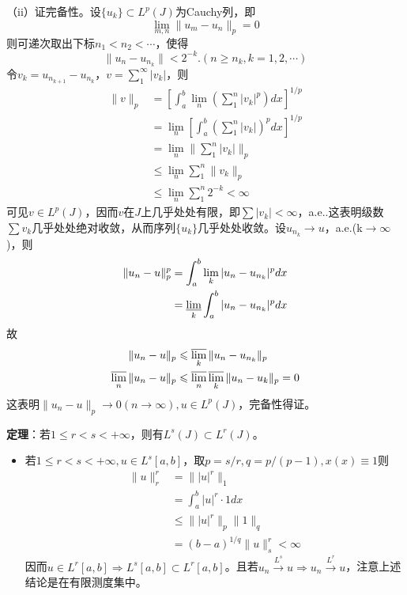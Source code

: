 \documentclass[12pt,a4paper]{article}
\begin{document}
\begin{itemize}
（ii）证完备性。设$\{u_k\}$$\subset L^p(J)$为Cauchy列，即
\begin{equation}
	\lim_{m,n}\|u_m-u_n\|_p=0
\end{equation}
则可递次取出下标$n_1<n_2<\cdots$，使得
\begin{equation}
	\|u_n-u_{n_k}\|<2^{-k}.(n\geq n_k,k=1,2,\cdots)
\end{equation}
令$v_k=u_{n_{k+1}}-u_{n_k}$，$v=\sum_1^\infty |v_k|$，则
\begin{equation}
	\begin{aligned}
		\|v\|_p&=\left[\int_a^b\lim_n(\sum_1^n|v_k|^p)dx\right]^{1/p}\\
		&=\lim_n\left[\int_a^b(\sum_1^n|v_k|)^pdx\right]^{1/p}\\
		&=\lim_n\|\sum_1^n|v_k|\|_p\\
		&\leqslant\lim_n\sum_1^n\|v_k\|_p\\
		&\leqslant\lim_n\sum_1^n2^{-k}<\infty
	\end{aligned}
\end{equation}
可见$v\in L^p(J)$，因而$v$在$J$上几乎处处有限，即$\sum|v_k|<\infty$，a.e..这表明级数$\sum v_k$几乎处处绝对收敛，从而序列$\{u_k\}$几乎处处收敛。设$u_{n_k}\rightarrow u$，a.e.(k$\rightarrow \infty$)，则
\begin{equation}
\begin{aligned}
	\|u_n-u\|_p^p&=\int_a^b\lim_k|u_n-u_{n_k}|^pdx\\
	&=\varliminf_k\int_a^b|u_n-u_{n_k}|^pdx
\end{aligned}
\end{equation}
故
\begin{equation}
	\begin{aligned}
		\|u_n-u\|_p&\leqslant\varlimsup_k\|u_n-u_{n_k}\|_p\\
		\varlimsup_n\|u_n-u\|_p&\leqslant\varlimsup_n\varlimsup_k\|u_n-u_k\|_p=0
	\end{aligned}
\end{equation}
这表明$\|u_n-u\|_p\rightarrow 0(n\rightarrow\infty),u\in L^p(J)$，完备性得证。
\end{itemize}

\textbf{定理}：若$1\leqslant r<s<+\infty$，则有$L^s(J)\subset L^r(J)$。
\begin{itemize}
	\item[]
	若$1\leqslant r<s<+\infty,u\in L^s[a,b]$，取$p=s/r,q=p/({p-1}),x(x)\equiv 1$则
	\begin{equation}
		\begin{aligned}
			\|u\|_r^r&=\||u|^r\|_1\\
			&=\int_a^b|u|^r\cdot 1dx\\
			&\leqslant \||u|^r\|_p\|1\|_q\\
			&=(b-a)^{1/q}\|u\|_s^r<\infty
		\end{aligned}
	\end{equation}
	因而$u\in L^r[a,b]\Rightarrow L^s[a,b]\subset L^r[a,b]$。且若$u_n\stackrel{L^s}{\longrightarrow}u\Rightarrow u_n\stackrel{L^r}{\longrightarrow}u$，注意上述结论是在有限测度集中。
\end{itemize}
\end{document}
